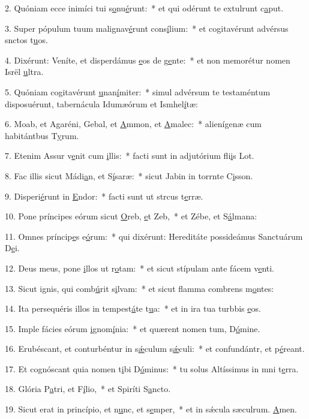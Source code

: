 2. Quóniam ecce inimíci tui s\uline{o}nu\uline{é}runt:~* et qui odérunt te extulrunt c\uline{a}put.\par 
3. Super pópulum tuum malignav\uline{é}runt cons\uline{í}lium:~* et cogitavérunt advérsus snctos t\uline{u}os.\par 
4. Dixérunt: Veníte, et disperdámus \uline{e}os de g\uline{e}nte:~* et non memorétur nomen Isrël \uline{u}ltra.\par 
5. Quóniam cogitavérunt \uline{u}nan\uline{í}miter:~* simul advérsum te testaméntum disposuérunt, tabernácula Idumæórum et Ismhel\uline{í}tæ:\par 
6. Moab, et Agaréni, Gebal, et \uline{A}mmon, et \uline{A}malec:~* alienígenæ cum habitántbus T\uline{y}rum.\par 
7. Etenim Assur v\uline{e}nit cum \uline{i}llis:~* facti sunt in adjutórium fli\uline{i}s Lot.\par 
8. Fac illis sicut Mádi\uline{a}n, et S\uline{í}saræ:~* sicut Jabin in torrnte C\uline{i}sson.\par 
9. Disperi\uline{é}runt in \uline{E}ndor:~* facti sunt ut strcus t\uline{e}rræ.\par 
10. Pone príncipes eórum sicut \uline{O}reb, \uline{e}t Zeb,~* et Zébe, et S\uline{á}lmana:\par 
11. Omnes príncip\uline{e}s e\uline{ó}rum:~* qui dixérunt: Hereditáte possideámus Sanctuárum D\uline{e}i.\par 
12. Deus meus, pone \uline{i}llos ut r\uline{o}tam:~* et sicut stípulam ante fácem v\uline{e}nti.\par 
13. Sicut ignis, qui comb\uline{ú}rit s\uline{i}lvam:~* et sicut flamma combrens m\uline{o}ntes:\par 
14. Ita persequéris illos in tempest\uline{á}te t\uline{u}a:~* et in ira tua turbbis \uline{e}os.\par 
15. Imple fácies eórum \uline{i}gnom\uline{í}nia:~* et quærent nomen tum, D\uline{ó}mine.\par 
16. Erubéscant, et conturbéntur in s\uline{ǽ}culum s\uline{ǽ}culi:~* et confundántr, et p\uline{é}reant.\par 
17. Et cognóscant quia nomen t\uline{i}bi D\uline{ó}minus:~* tu solus Altíssimus in mni t\uline{e}rra.\par 
18. Glória P\uline{a}tri, et F\uline{í}lio,~* et Spiríti S\uline{a}ncto.\par 
19. Sicut erat in princípio, et n\uline{u}nc, et s\uline{e}mper,~* et in sǽcula sæculrum. \uline{A}men.\par 
